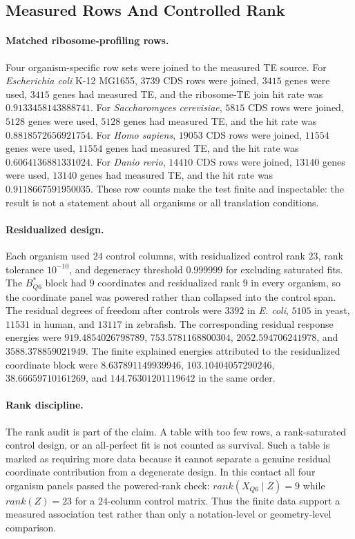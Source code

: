\subsection{Measured Rows And Controlled Rank}\label{sec:q6-ribosome-te-survival-controlled-rank}

\paragraph{Matched ribosome-profiling rows.}
Four organism-specific row sets were joined to the measured TE source.  For \emph{Escherichia coli} K-12 MG1655, $3739$ CDS rows were joined, $3415$ genes were used, $3415$ genes had measured TE, and the ribosome-TE join hit rate was $0.9133458143888741$.  For \emph{Saccharomyces cerevisiae}, $5815$ CDS rows were joined, $5128$ genes were used, $5128$ genes had measured TE, and the hit rate was $0.8818572656921754$.  For \emph{Homo sapiens}, $19053$ CDS rows were joined, $11554$ genes were used, $11554$ genes had measured TE, and the hit rate was $0.6064136881331024$.  For \emph{Danio rerio}, $14410$ CDS rows were joined, $13140$ genes were used, $13140$ genes had measured TE, and the hit rate was $0.9118667591950035$.  These row counts make the test finite and inspectable: the result is not a statement about all organisms or all translation conditions.

\paragraph{Residualized design.}
Each organism used $24$ control columns, with residualized control rank $23$, rank tolerance $10^{-10}$, and degeneracy threshold $0.999999$ for excluding saturated fits.  The $B^*_{Q6}$ block had $9$ coordinates and residualized rank $9$ in every organism, so the coordinate panel was powered rather than collapsed into the control span.  The residual degrees of freedom after controls were $3392$ in \emph{E. coli}, $5105$ in yeast, $11531$ in human, and $13117$ in zebrafish.  The corresponding residual response energies were $919.4854026798789$, $753.5781168800304$, $2052.594706241978$, and $3588.378859021949$.  The finite explained energies attributed to the residualized coordinate block were $8.637891149939946$, $103.10404057290246$, $38.66659710161269$, and $144.76301201119642$ in the same order.

\paragraph{Rank discipline.}
The rank audit is part of the claim.  A table with too few rows, a rank-saturated control design, or an all-perfect fit is not counted as survival.  Such a table is marked as requiring more data because it cannot separate a genuine residual coordinate contribution from a degenerate design.  In this contact all four organism panels passed the powered-rank check: $rank(X_{Q6}\mid Z)=9$ while $rank(Z)=23$ for a $24$-column control matrix.  Thus the finite data support a measured association test rather than only a notation-level or geometry-level comparison.
